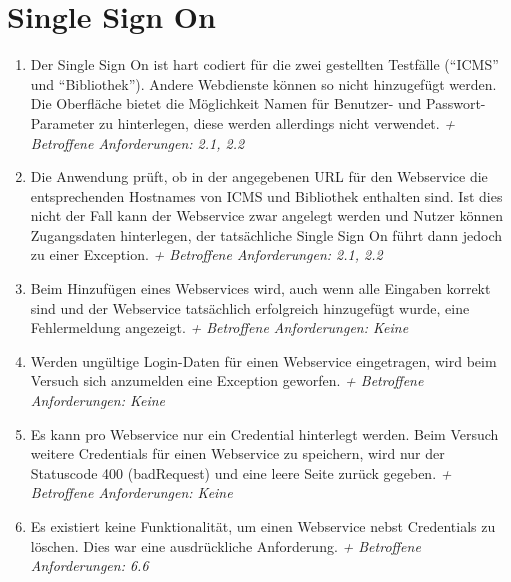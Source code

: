 \documentclass[12pt,DIV14,BCOR10mm,a4paper,parskip=half-,headsepline,headinclude,english,ngerman,bibliography=totocnumbered]{scrreprt}
\begin{document}
\section{Single Sign On}
\begin{enumerate}[resume]
 \item Der Single Sign On ist hart codiert für die zwei gestellten Testfälle (\enquote{ICMS} und \enquote{Bibliothek}). Andere Webdienste können so nicht hinzugefügt werden. Die Oberfläche bietet die Möglichkeit Namen für Benutzer- und Passwort-Parameter zu hinterlegen, diese werden allerdings nicht verwendet.\newline
\textit{+ Betroffene Anforderungen: 2.1, 2.2}

\item Die Anwendung prüft, ob in der angegebenen URL für den Webservice die entsprechenden Hostnames von ICMS und Bibliothek enthalten sind. Ist dies nicht der Fall kann der Webservice zwar angelegt werden und Nutzer können Zugangsdaten hinterlegen, der tatsächliche Single Sign On führt dann jedoch zu einer Exception.\newline
\textit{+ Betroffene Anforderungen: 2.1, 2.2}

\item Beim Hinzufügen eines Webservices wird, auch wenn alle Eingaben korrekt sind und der Webservice tatsächlich erfolgreich hinzugefügt wurde, eine Fehlermeldung angezeigt.\newline
\textit{+ Betroffene Anforderungen: Keine}

\item Werden ungültige Login-Daten für einen Webservice eingetragen, wird beim Versuch sich anzumelden eine Exception geworfen.\newline
\textit{+ Betroffene Anforderungen: Keine}

\item Es kann pro Webservice nur ein Credential hinterlegt werden. Beim Versuch weitere Credentials für einen Webservice zu speichern, wird nur der Statuscode 400 (badRequest) und eine leere Seite zurück gegeben.\newline
\textit{+ Betroffene Anforderungen: Keine}

\item Es existiert keine Funktionalität, um einen Webservice nebst Credentials zu löschen. Dies war eine ausdrückliche Anforderung.\newline
\textit{+ Betroffene Anforderungen: 6.6}
 \end{enumerate}
\end{document}
